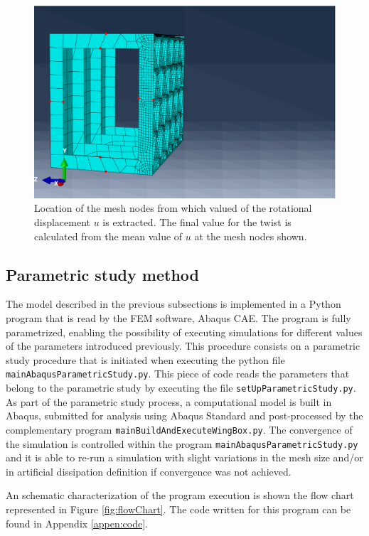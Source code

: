     \begin{figure}[!htpb]
      \centering
      \includegraphics[width=0.6 \textwidth]{figures/../figures/model/pointsToEvaluateTwist}
      \caption[Location of the mesh nodes from which valued of the rotational displacement $u$ is extracted]{Location of the mesh nodes from which valued of the rotational displacement $u$ is extracted. The final value for the twist is calculated from the mean value of $u$ at the mesh nodes shown.}
      \label{fig:pointsToEvaluateTwist}
    \end{figure}
  
  \subsection{Parametric study method} \label{subsec:parametricStudy_computationalModel}

    The model described in the previous subsections is implemented in a Python program that is read by the FEM software, Abaqus CAE. The program is fully parametrized, enabling the possibility of executing simulations for different values of the parameters introduced previously. This procedure consists on a parametric study procedure that is initiated when executing the python file \texttt{mainAbaqusParametricStudy.py}. This piece of code reads the parameters that belong to the parametric study by executing the file \texttt{setUpParametricStudy.py}. As part of the parametric study process, a computational model is built in Abaqus, submitted for analysis using Abaqus Standard and post-processed by the complementary program \texttt{mainBuildAndExecuteWingBox.py}. The convergence of the simulation is controlled within the program \texttt{mainAbaqusParametricStudy.py} and it is able to re-run a simulation with slight variations in the mesh size and/or in artificial dissipation definition if convergence was not achieved. 

    An schematic characterization of the program execution is shown the flow chart represented in Figure \ref{fig:flowChart}. The code written for this program can be found in Appendix \ref{appen:code}. 

